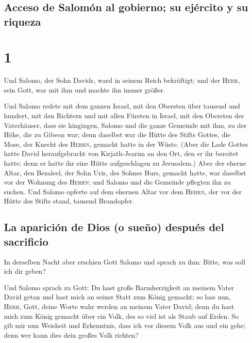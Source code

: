 \hypertarget{acceso-de-salomuxf3n-al-gobierno-su-ejuxe9rcito-y-su-riqueza}{%
\subsection{Acceso de Salomón al gobierno; su ejército y su
riqueza}\label{acceso-de-salomuxf3n-al-gobierno-su-ejuxe9rcito-y-su-riqueza}}

\hypertarget{section}{%
\section{1}\label{section}}

 Und Salomo, der Sohn Davids, ward in seinem Reich
bekräftigt; und der \textsc{Herr}, sein Gott, war mit ihm und machte ihn
immer größer.

 Und Salomo redete mit dem ganzen Israel, mit den Obersten
über tausend und hundert, mit den Richtern und mit allen Fürsten in
Israel, mit den Obersten der Vaterhäuser,  dass sie
hingingen, Salomo und die ganze Gemeinde mit ihm, zu der Höhe, die zu
Gibeon war; denn daselbst war die Hütte des Stifts Gottes, die Mose, der
Knecht des \textsc{Herrn}, gemacht hatte in der Wüste. 
(Aber die Lade Gottes hatte David heraufgebracht von Kirjath-Jearim an
den Ort, den er ihr bereitet hatte; denn er hatte ihr eine Hütte
aufgeschlagen zu Jerusalem.)  Aber der eherne Altar, den
Bezaleel, der Sohn Uris, des Sohnes Hurs, gemacht hatte, war daselbst
vor der Wohnung des \textsc{Herrn}; und Salomo und die Gemeinde pflegten
ihn zu suchen.  Und Salomo opferte auf dem ehernen Altar
vor dem \textsc{Herrn}, der vor der Hütte des Stifts stand, tausend
Brandopfer.

\hypertarget{la-apariciuxf3n-de-dios-o-sueuxf1o-despuuxe9s-del-sacrificio}{%
\subsection{La aparición de Dios (o sueño) después del
sacrificio}\label{la-apariciuxf3n-de-dios-o-sueuxf1o-despuuxe9s-del-sacrificio}}

 In derselben Nacht aber erschien Gott Salomo und sprach
zu ihm: Bitte, was soll ich dir geben?

 Und Salomo sprach zu Gott: Du hast große Barmherzigkeit
an meinem Vater David getan und hast mich an seiner Statt zum König
gemacht;  so lass nun, \textsc{Herr}, Gott, deine Worte
wahr werden an meinem Vater David; denn du hast mich zum König gemacht
über ein Volk, des so viel ist als Staub auf Erden.  So
gib mir nun Weisheit und Erkenntnis, dass ich vor diesem Volk aus und
ein gehe; denn wer kann dies dein großes Volk richten?

